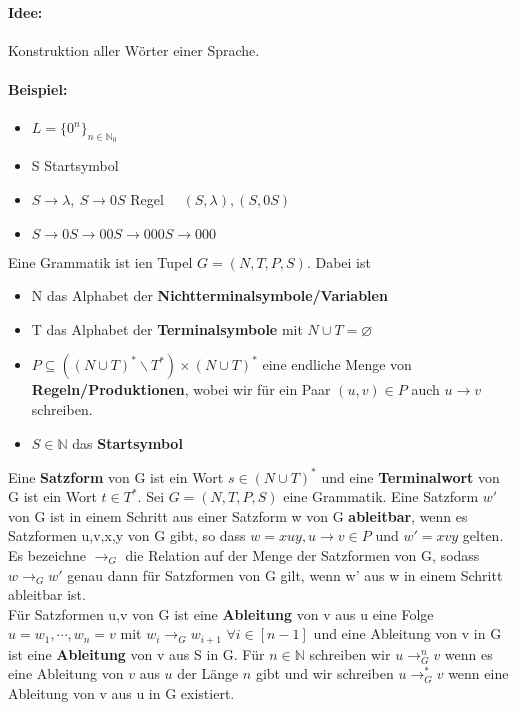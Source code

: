 \usetikzlibrary{trees}
\paragraph*{Idee:} Konstruktion aller Wörter einer Sprache.
\paragraph*{Beispiel:} 
\begin{itemize}
    \renewcommand{\labelitemi}{} %

    \item \(L=\{0^n\}_{n\in\mathbb{N}_0}\)
    \item S Startsymbol
    \item \(S\to \lambda, \ S\to 0S\) Regel \( \quad (S, \lambda), (S, 0S)\)
    \item \(S\to 0S\to 00S\to 000S\to 000\)


\end{itemize}
    Eine Grammatik ist ien Tupel \(G=(N,T,P,S)\). Dabei ist 
    \begin{itemize}
        \item N das Alphabet der \textbf{Nichtterminalsymbole/Variablen} 
        \item T das Alphabet der \textbf{Terminalsymbole} mit \(N\cup T=\varnothing \)
        \item \(P\subseteq((N\cup T)^*\backslash T^*)\times (N\cup T)^*\) eine endliche Menge von \textbf{Regeln/Produktionen}, wobei wir für ein Paar \((u, v) \in P\) auch \( u \to v\) schreiben.
        \item \(S\in\mathbb{N}\) das \textbf{Startsymbol}
    \end{itemize}
    Eine \textbf{Satzform} von G ist ein Wort \(s\in(N\cup T)^*\) und eine \textbf{Terminalwort} von G ist ein Wort \(t\in T^*\).
    Sei \(G=(N,T,P,S)\) eine Grammatik. Eine Satzform \(w'\) von G ist in einem Schritt aus einer Satzform w von G \textbf{ableitbar}, wenn es Satzformen u,v,x,y von G gibt, so dass \(w=xuy,u\to v\in P\) und \(w'=xvy\) gelten. Es bezeichne \(\to_G\) die Relation auf der Menge der Satzformen von G, sodass \(w\to_Gw'\) genau dann für Satzformen von G gilt, wenn w' aus w in einem Schritt ableitbar ist.\\
    Für Satzformen u,v von G ist eine \textbf{Ableitung} von v aus u eine Folge \(u=w_1,\cdots,w_n=v\) mit \(w_i\to_Gw_{i+1}\) \(\forall i\in[n-1]\) und eine Ableitung von v in G ist eine \textbf{Ableitung} von v aus S in G. Für \(n\in\mathbb{N}\) schreiben wir \(u\to^n_Gv\) wenn es eine Ableitung von $v$ aus $u$ der Länge $n$ gibt und wir schreiben \(u\to^*_Gv\) wenn eine Ableitung von v aus u in G existiert.\\\\

